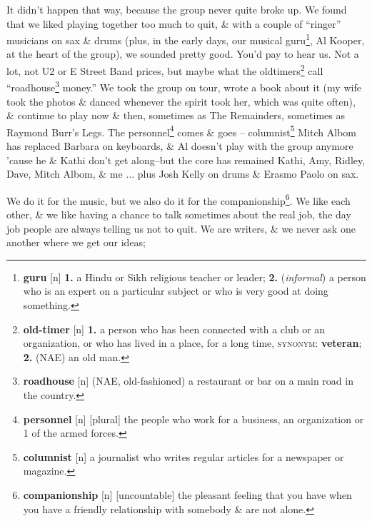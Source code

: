 \documentclass[oneside]{book}
\numberwithin{equation}{section}
\begin{document}
It didn't happen that way, because the group never quite broke up. We found that we liked playing together too much to quit, \& with a couple of ``ringer'' musicians on sax \& drums (plus, in the early days, our musical guru\footnote{\textbf{guru} [n] \textbf{1.} a Hindu or Sikh religious teacher or leader; \textbf{2.} (\textit{informal}) a person who is an expert on a particular subject or who is very good at doing something.}, Al Kooper, at the heart of the group), we sounded pretty good. You'd pay to hear us. Not a lot, not U2 or E Street Band prices, but maybe what the oldtimers\footnote{\textbf{old-timer} [n] \textbf{1.} a person who has been connected with a club or an organization, or who has lived in a place, for a long time, \textsc{synonym}: \textbf{veteran}; \textbf{2.} (NAE) an old man.} call ``roadhouse\footnote{\textbf{roadhouse} [n] (NAE, old-fashioned) a restaurant or bar on a main road in the country.} money.'' We took the group on tour, wrote a book about it (my wife took the photos \& danced whenever the spirit took her, which was quite often), \& continue to play now \& then, sometimes as The Remainders, sometimes as Raymond Burr's Legs. The personnel\footnote{\textbf{personnel} [n] [plural] the people who work for a business, an organization or 1 of the armed forces.} comes \& goes -- columnist\footnote{\textbf{columnist} [n] a journalist who writes regular articles for a newspaper or magazine.} Mitch Albom has replaced Barbara on keyboards, \& Al doesn't play with the group anymore 'cause he \& Kathi don't get along--but the core has remained Kathi, Amy, Ridley, Dave, Mitch Albom, \& me $\ldots$ plus Josh Kelly on drums \& Erasmo Paolo on sax.

We do it for the music, but we also do it for the companionship\footnote{\textbf{companionship} [n] [uncountable] the pleasant feeling that you have when you have a friendly relationship with somebody \& are not alone.}. We like each other, \& we like having a chance to talk sometimes about the real job, the day job people are always telling us not to quit. We are writers, \& we never ask one another where we get our ideas; 
\end{document}
